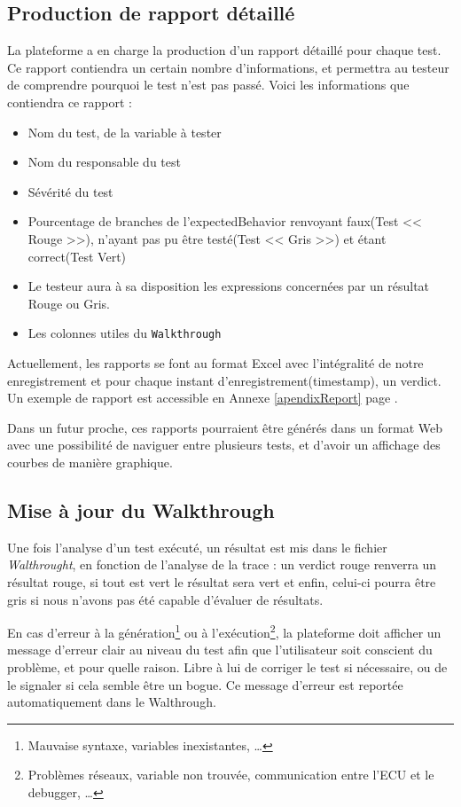\subsection{Production de rapport détaillé}\label{report}
La plateforme a en charge la production d'un rapport détaillé pour chaque test. Ce rapport contiendra un certain nombre d'informations, et permettra au testeur de comprendre pourquoi le test n'est pas passé. Voici les informations que contiendra ce rapport : 

\begin{itemize}
	\item Nom du test, de la variable à tester
	\item Nom du responsable du test
	\item Sévérité du test
	\item Pourcentage de branches de l'expectedBehavior renvoyant faux(Test << Rouge >>), n'ayant pas pu être testé(Test << Gris >>) et étant correct(Test Vert)
	\item Le testeur aura à sa disposition les expressions concernées par un résultat Rouge ou Gris.
	\item Les colonnes utiles du \texttt{Walkthrough}
\end{itemize}

Actuellement, les rapports se font au format Excel avec l'intégralité de notre enregistrement et pour chaque instant d'enregistrement(timestamp), un verdict. Un
exemple de rapport est accessible en Annexe \ref{apendixReport} page \pageref{apendixReport}. 

Dans un futur proche, ces rapports pourraient être générés dans un format Web avec une possibilité de naviguer entre plusieurs tests, et
d'avoir un affichage des courbes de manière graphique.

\subsection{Mise à jour du Walkthrough}
Une fois l'analyse d'un test exécuté, un résultat est mis dans le fichier \textit{Walthrought}, en fonction de l'analyse de la trace : un verdict rouge renverra un résultat rouge, si tout est vert le résultat sera vert et enfin, celui-ci pourra être gris si nous n'avons pas été capable d'évaluer de résultats.

\begin{remarque}
	En cas d'erreur à la génération\footnote{Mauvaise syntaxe, variables inexistantes, \ldots} ou à l'exécution\footnote{Problèmes réseaux, variable non trouvée, communication entre l'ECU et le debugger, \ldots}, la plateforme doit afficher un message d'erreur clair au niveau du test afin que l'utilisateur soit conscient du problème, et pour quelle raison. Libre à lui de corriger le test si nécessaire, ou de le signaler si cela semble être un bogue. Ce message d'erreur est reportée automatiquement dans le Walthrough.
\end{remarque}

